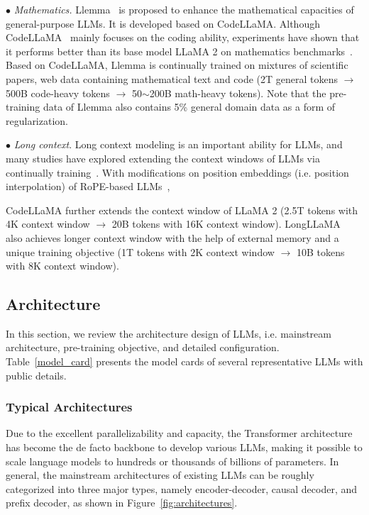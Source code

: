 {$\bullet$ \emph{Mathematics.} Llemma~\cite{Azerbayev-arxiv-2023-llemma} is proposed to enhance the mathematical capacities of general-purpose LLMs. It is developed based on CodeLLaMA. Although CodeLLaMA~\cite{Roziere-arxiv-2023-codellama} mainly focuses on the coding ability, experiments have shown that it performs better than its base model LLaMA 2 on mathematics benchmarks~\cite{Azerbayev-arxiv-2023-llemma}. Based on CodeLLaMA, Llemma is continually trained on mixtures of scientific papers, web data containing mathematical text and  code (2T general tokens $\rightarrow$ 500B code-heavy tokens $\rightarrow$ 50$\sim$200B math-heavy tokens). Note that the pre-training data of Llemma also contains 5\% general domain data as a form of regularization.

$\bullet$ \emph{Long context}. Long context modeling is an important ability for LLMs, and many studies have explored extending the context windows of LLMs via continually training~\cite{Roziere-arxiv-2023-codellama,Tworkowski-arxiv-2023-Focused}. With modifications on position embeddings (i.e. position interpolation) of RoPE-based LLMs~\cite{Touvron-2023-llama2-arxiv,Touvron-arxiv-2023-LLaMA,Chen-arxiv-2023-Extending}, 

CodeLLaMA further extends the context window of LLaMA 2 (2.5T tokens with 4K context window $\rightarrow$ 20B tokens with 16K context window). LongLLaMA~\cite{Tworkowski-arxiv-2023-Focused} also achieves longer context window with the help of external memory and a unique training objective (1T tokens with 2K context window $\rightarrow$ 10B tokens with 8K context window).

\subsection{Architecture}
\label{sec:architecture}
 In this section, we review the architecture design  of LLMs, i.e. mainstream architecture, pre-training objective, and detailed configuration. Table~\ref{model_card}  presents the model cards of several representative LLMs with public details.  

\subsubsection{Typical Architectures}\label{sec:archs}

Due to the excellent parallelizability and capacity, the Transformer architecture~\cite{Vaswani-NIPS-2017-Attention} has become the de facto backbone to develop various LLMs, making it possible to scale language models to hundreds or thousands of billions of parameters. In general, the mainstream architectures of existing LLMs can be roughly categorized into three major types, namely encoder-decoder, causal decoder, and prefix decoder, as shown in Figure~\ref{fig:architectures}. 

}
